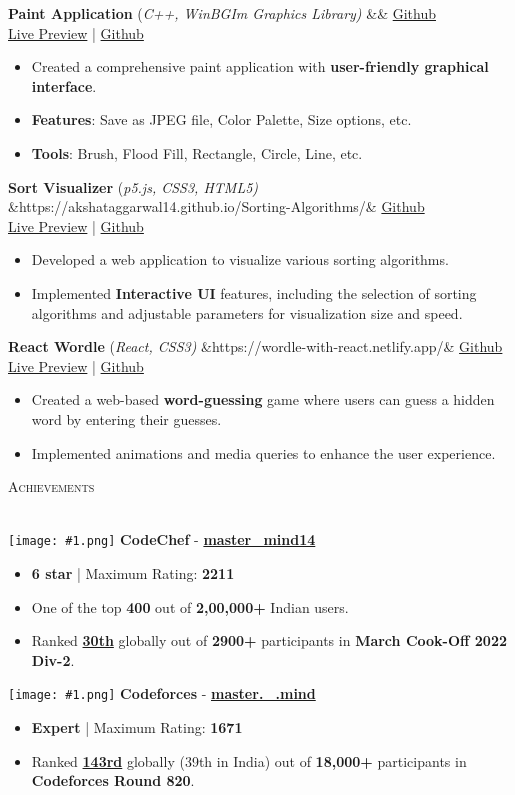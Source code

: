 \documentclass[a4paper]{article}
\newcommand{\tinyBulletSep} { \vspace{1.2mm} }
\newcommand{\bulletSep} { \vspace{2.2mm} }
\newcommand{\sectionSep} { \vspace{3mm} }
\newcommand{\lineunder} {
    \vspace*{-8pt} \\
    \hspace*{-15pt} \hrulefill \\
}
\newcommand{\header} [1] {
    {\hspace*{-18pt}\vspace*{6pt} {
        \fontfamily{qcs}\selectfont \large \scshape #1
    }}
    \vspace*{-6pt} \lineunder
    \vspace{0.5mm}
}
\newcommand{\projectItem}[5]{
    {\textbf{#1}} {(\sl #2)}\hfill
    \ifx&#3&%
    \href{#4}{Github}\\
    \else
    \href{#3}{Live Preview} | \href{#4}{Github}\\
    \fi
    \begin{itemize}
        #5
    \end{itemize}
}
\newcommand{\image}[1]{
    \begingroup\normalfont
    \Large
    \texttt{[image: \#1.png]}%
    \endgroup
}
\begin{document}
\projectItem{Paint Application}{C++, WinBGIm Graphics Library}{}{https://github.com/Sahil-187/Paint-Application}{
    \item Created a comprehensive paint application with \textbf{user-friendly graphical interface}.
    \item \textbf{Features}: Save as JPEG file, Color Palette, Size options, etc.
    \item \textbf{Tools}: Brush, Flood Fill, Rectangle, Circle, Line, etc.
}
\bulletSep

\projectItem{Sort Visualizer}{p5.js, CSS3, HTML5}{https://akshataggarwal14.github.io/Sorting-Algorithms/}{https://github.com/AkshatAggarwal14/Sorting-Algorithms/}{
    \item Developed a web application to visualize various sorting algorithms.
    \item Implemented \textbf{Interactive UI} features, including the selection of sorting algorithms and adjustable parameters for visualization size and speed.
}\bulletSep

\projectItem{React Wordle}{React, CSS3}{https://wordle-with-react.netlify.app/}{https://github.com/AkshatAggarwal14/react-wordle}{
    \item Created a web-based \textbf{word-guessing} game where users can guess a hidden word by entering their guesses.
    \item Implemented animations and media queries to enhance the user experience.
}
\sectionSep


\header{Achievements}
\image{cc} \textbf{CodeChef} - \textbf{\href{https://www.codechef.com/users/master_mind14}{master\_mind14}}
\begin{itemize}
    \item \textbf{6 star} | Maximum Rating: \textbf{2211}
    \item One of the top \textbf{400} out of \textbf{2,00,000+} Indian users.
    \item Ranked \textbf{\href{https://www.codechef.com/rankings/COOK139B?itemsPerPage=100&order=asc&page=1&search=master_mind14&sortBy=rank}{30th}} globally out of \textbf{2900+} participants in \textbf{March Cook-Off 2022 Div-2}.
\end{itemize}
\tinyBulletSep

\image{cf} \textbf{Codeforces} - \textbf{\href{https://codeforces.com/profile/master._.mind}{master.\_.mind}}
\begin{itemize}
    \item \textbf{Expert} | Maximum Rating: \textbf{1671}
    \item Ranked \textbf{\href{https://codeforces.com/contest/1729/standings/participant/140098304\#p140098304}{143rd}} globally (39th in India) out of \textbf{18,000+} participants in \textbf{Codeforces Round 820}.
\end{itemize}
\tinyBulletSep
\end{document}

